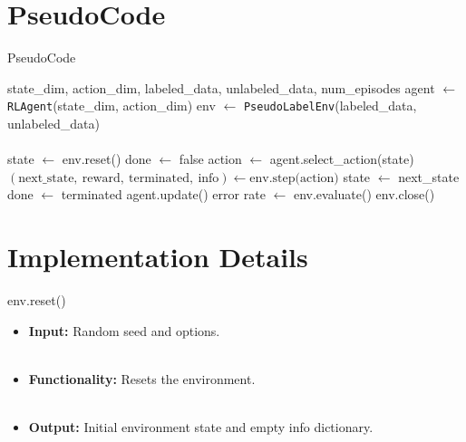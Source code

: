 \documentclass{beamer}
\begin{document}
\section{PseudoCode}
\begin{frame}{PseudoCode}
  \begin{algorithm}[H]
    \caption{RL agent training loop}
    \label{alg:rl_training_algpseudocode}
    \scriptsize
    \begin{algorithmic}
      \Require state\_dim, action\_dim, labeled\_data, unlabeled\_data, num\_episodes
      \State agent $\leftarrow$ \texttt{RLAgent}(state\_dim, action\_dim)
      \State env $\leftarrow$ \texttt{PseudoLabelEnv}(labeled\_data, unlabeled\_data) \\~\\
      \State state $\leftarrow$ env.reset()
      \State done $\leftarrow$ false
      \State action $\leftarrow$ agent.select\_action(state)
      \State $(\text{next\_state},\ \text{reward},\ \text{terminated},\ \text{info}) \leftarrow \text{env.step(action)}$
      \State state $\leftarrow$ next\_state
      \State done $\leftarrow$ terminated
      \EndWhile
      \State agent.update()
      \State error rate $\leftarrow$ env.evaluate()
      \EndFor
      \State env.close()
    \end{algorithmic}
  \end{algorithm}
\end{frame}


\section{Implementation Details}

\begin{frame}[fragile]{env.reset()}
  \begin{itemize}
       \\~\\
    \item \textbf{Input:} Random seed and options. \\~\\
    \item \textbf{Functionality:} Resets the environment. \\~\\ %
    \item \textbf{Output:} Initial environment state and empty info dictionary.
  \end{itemize}
\end{frame}
\end{document}
